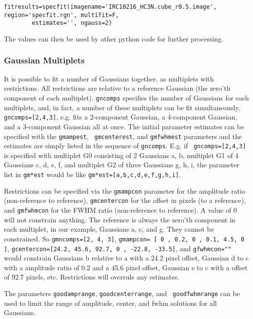 \small
\begin{verbatim}
fitresults=specfit(imagename='IRC10216_HC3N.cube_r0.5.image', region='specfit.rgn', multifit=F,
        estimates='', ngauss=2)
\end{verbatim}
\normalsize

The values can then be used by other python code for further
processing. 


\subsubsection{Gaussian Multiplets}
\label{section:analysis.specfit.lorgau.multiplet}
It is possible to fit a number of Gaussians together, as multiplets
with restrictions. All restrictions are relative to a reference
Gaussian (the zero'th component of each multiplet). {\tt gncomps}
specifies the number of Gaussians for each multiplets, and, in fact, a
number of these multiplets can be fit simultaneously. {\tt
  gncomps=[2,4,3]}, e.g. fits a 2-component Gaussian, a 4-component
Gaussian, and a 3-component Gaussian all at once. The initial
parameter estimates can be specified with the {\tt gmampest}, {\tt
  gmcenterest}, and {\tt gmfwhmest} parameters and the estimates
are simply listed in the sequence of {\tt gncomps}. E.g. if {\tt
  gncomps=[2,4,3]} is specified with multiplet G0 consisting of 2
Gaussians a, b, multiplet G1 of 4 Gaussians c, d, e, f, and multiplet
G2 of three Gaussians g, h, i, the parameter list in {\tt gm*est} would be
like {\tt gm*est=[a,b,c,d,e,f,g,h,i]}.

Restrictions can be specified via the {\tt gmampcon} parameter for the
amplitude ratio (non-reference to reference), {\tt gmcentercon} for
the offset in pixels (to a reference), and {\tt gmfwhmcon} for the
FWHM ratio (non-reference to reference). A value of 0 will not
constrain anything. The reference is always the zero'th component in
each multiplet, in our example, Gaussians a, c, and g. They cannot be
constrained. So {\tt gmncomps=[2, 4, 3]}, {\tt gmampcon= [ 0 , 0.2, 0
  , 0.1, 4.5, 0 ]}, {\tt gcentercon=[24.2, 45.6, 92.7, 0 , -22.8,
  -33.5]}, and {\tt gfwhmcon=""} would constrain Gaussians b relative
to a with a 24.2 pixel offset, Gaussian d to c with a amplitude ratio
of 0.2 and a 45.6 pixel offset, Gaussian e to c with a offset of 92.7
pixels, etc. Restrictions will overrule any estimates.

The parameters {\tt goodamprange}, {\tt goodcenterrange}, and {\tt
  goodfwhmrange} can be used to limit the range of amplitude, center,
and fwhm solutions for all Gaussians.


